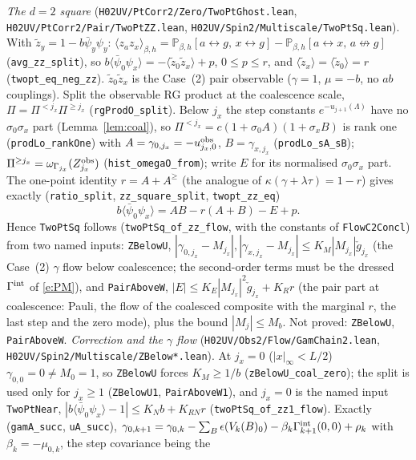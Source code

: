 \documentclass[11pt]{amsart}
\theoremstyle{definition}
\theoremstyle{remark}
\numberwithin{equation}{section}
\newcommand{\Pb}{\mathbb{P}}
\newcommand{\avg}[1]{\langle #1\rangle}
\newcommand{\conn}{\leftrightarrow}
\begin{document}
\emph{The $d=2$ square} (\texttt{H02UV/PtCorr2/Zero/TwoPtGhost.lean}, \texttt{H02UV/PtCorr2/Pair/TwoPtZZ.lean}, \texttt{H02UV/Spin2/Multiscale/TwoPtSq.lean}). With
$\tilde z_y=1-b\bar\psi_y\psi_y$: $\avg{z_az_x}_{\beta,h}=\Pb_{\beta,h}[a\leftrightarrow g,\,x\leftrightarrow g]-\Pb_{\beta,h}[a\conn x,\,a\not\leftrightarrow g]$
(\texttt{avg\_zz\_split}), so $b\avg{\bar\psi_0\psi_x}=-\avg{\tilde z_0\tilde z_x}+p$, $0\le p\le r$, and $\avg{\tilde z_x}=\avg{\tilde z_0}=r$
(\texttt{twopt\_eq\_neg\_zz}). $\tilde z_0\tilde z_x$ is the Case~(2) pair observable ($\gamma=1$, $\mu=-b$, no $ab$ couplings). Split the
observable RG product at the coalescence scale, $\Pi=\Pi^{<j_x}\Pi^{\ge j_x}$ (\texttt{rgProdO\_split}). Below $j_x$ the step constants
$e^{-u_{j+1}(\Lambda)}$ have no $\sigma_0\sigma_x$ part (Lemma~\ref{lem:coal}), so $\Pi^{<j_x}=c(1+\sigma_0A)(1+\sigma_xB)$ is rank one
(\texttt{prodLo\_rankOne}) with $A=\gamma_{0,j_x}=-u^{\rm obs}_{j_x,0}$, $B=\gamma_{x,j_x}$ (\texttt{prodLo\_sA\_sB}); $\Pi^{\ge j_x}=\omega_{\Gamma_{j_x}}(Z^{\rm obs}_{j_x})$
(\texttt{hist\_omegaO\_from}); write $E$ for its normalised $\sigma_0\sigma_x$ part. The one-point identity $r=A+A^{\ge}$ (the analogue of
$\kappa(\gamma+\lambda\tau)=1-r$) gives exactly (\texttt{ratio\_split}, \texttt{zz\_square\_split}, \texttt{twopt\_zz\_eq})
\[
  b\avg{\bar\psi_0\psi_x}=AB-r(A+B)-E+p .
\]
Hence \texttt{TwoPtSq} follows (\texttt{twoPtSq\_of\_zz\_flow}, with the constants of \texttt{FlowC2Concl}) from two named inputs:
\texttt{ZBelowU}, $|\gamma_{0,j_x}-M_{j_x}|,|\gamma_{x,j_x}-M_{j_x}|\le K_M|M_{j_x}|\check g_{j_x}$ (the Case~(2) $\gamma$ flow below coalescence;
the second-order terms must be the dressed $\Gamma^{\rm int}$ of \eqref{e:PM}), and \texttt{PairAboveW}, $|E|\le K_E|M_{j_x}|^2\check g_{j_x}+K_Rr$
(the pair part at coalescence: Pauli, the flow of the coalesced composite with the marginal $r$, the last step and the zero mode),
plus the bound $|M_j|\le M_b$. Not proved: \texttt{ZBelowU}, \texttt{PairAboveW}.
\emph{Correction and the $\gamma$ flow} (\texttt{H02UV/Obs2/Flow/GamChain2.lean}, \texttt{H02UV/Spin2/Multiscale/ZBelow*.lean}). At $j_x=0$ ($|x|_\infty<L/2$)
$\gamma_{0,0}=0\ne M_0=1$, so \texttt{ZBelowU} forces $K_M\ge1/b$ (\texttt{zBelowU\_coal\_zero}); the split is used only for
$j_x\ge1$ (\texttt{ZBelowU1}, \texttt{PairAboveW1}), and $j_x=0$ is the named input \texttt{TwoPtNear},
$|b\avg{\bar\psi_0\psi_x}-1|\le K_Nb+K_{RN}r$ (\texttt{twoPtSq\_of\_zz1\_flow}). Exactly (\texttt{gamA\_succ}, \texttt{uA\_succ}),
$\gamma_{0,k+1}=\gamma_{0,k}-\sum_B\epsilon(V_k(B)_0)-\beta_k\Gamma^{\rm int}_{k+1}(0,0)+\rho_k$ with $\beta_k=-\mu_{0,k}$, the step covariance being the
\end{document}
